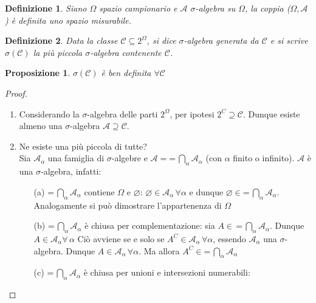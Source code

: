 \documentclass[a4paper,12pt]{article}
\theoremstyle{break}
\newtheorem{proposition}{Proposizione}[section]
\newtheorem{definition}{Definizione}[section]
\let\emptyset\varnothing
\numberwithin{equation}{section}
\begin{document}
\begin{definition}
Siano $\Omega$ spazio campionario e $\mathcal{A}$ $\sigma$-algebra su $\Omega$, la coppia ($\Omega, \mathcal{A}$) è definita uno spazio misurabile.
\end{definition}
\begin{definition}
Data la classe $\mathcal{C} \subseteq 2^{\Omega}$, si dice $\sigma$-algebra generata da $\mathcal{C}$ e si scrive $\sigma(\mathcal{C})$ la più piccola $\sigma$-algebra contenente $\mathcal{C}$.
\end{definition}
\begin{proposition}
$\sigma(\mathcal{C})$ è ben definita $\forall \mathcal{C}$
\end{proposition}
\begin{proof}
\begin{enumerate}
\item Considerando la $\sigma$-algebra delle parti $2^{\Omega}$, per ipotesi $2^{C} \supseteq \mathcal{C}$. Dunque esiste almeno una $\sigma$-algebra $\mathcal{A} \supseteq \mathcal{C}$.
\item Ne esiste una più piccola di tutte? \\
Sia $\mathcal{A}_{\alpha}$ una famiglia di $\sigma$-algebre e $\mathcal{A} = ${\everymath ={\displaystyle}$\, \bigcap_{\alpha} \mathcal{A}_{\alpha}$} (con $\alpha$ finito o infinito).
$\mathcal{A}$ è una $\sigma$-algebra, infatti:
\begin{itemize}
\item[(a)]{\everymath ={\displaystyle}$\, \bigcap_{\alpha} \mathcal{A}_{\alpha}$} contiene $\Omega$ e $\emptyset$: $\emptyset \in \mathcal{A}_{\alpha} \, \forall \alpha$ e dunque $\emptyset \in${\everymath ={\displaystyle}$\, \bigcap_{\alpha} \mathcal{A}_{\alpha}$}.
Analogamente si può dimostrare l'appartenenza di $\Omega$
\item[(b)] {\everymath ={\displaystyle}$\, \bigcap_{\alpha} \mathcal{A}_{\alpha}$} è chiusa per complementazione: sia $A \in \,${\everymath ={\displaystyle}$\, \bigcap_{\alpha} \mathcal{A}_{\alpha}$}. Dunque $A \in \mathcal{A}_{\alpha} \forall \, \alpha$
Ciò avviene se e solo se $A^C \in \mathcal{A}_{\alpha} \, \forall \alpha$, essendo $\mathcal{A}_{\alpha}$ una $\sigma$-algebra. Dunque $A \in \mathcal{A}_{\alpha} \, \forall \alpha$.
Ma allora $A^C \in${\everymath ={\displaystyle}$\, \bigcap_{\alpha} \mathcal{A}_{\alpha}$}
\item[(c)] {\everymath ={\displaystyle}$\, \bigcap_{\alpha} \mathcal{A}_{\alpha}$} è chiusa per unioni e intersezioni numerabili:

\end{itemize}
\end{enumerate}
\end{proof}
\end{document}

